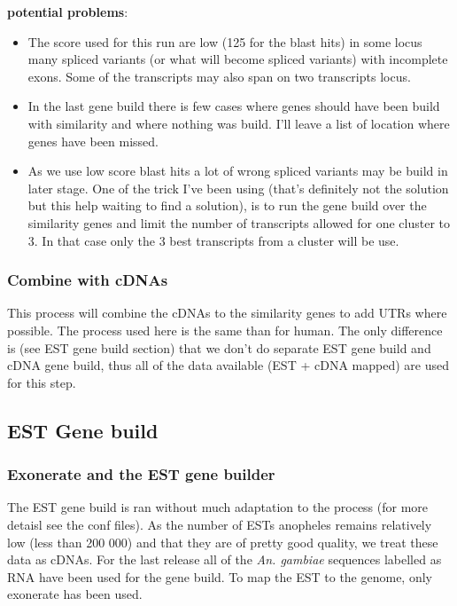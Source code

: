 \documentclass[a4paper,10pt]{article}
\begin{document}
\textbf{potential problems}: 
\begin{itemize}
\item The score used for this run are low (125 for the blast hits) in some locus many spliced variants (or what will become spliced variants) with incomplete exons. Some of the transcripts may also span on two transcripts locus.
\item In the last gene build there is few cases where genes should have been build with similarity and where nothing was build. I'll leave a list of location where genes have been missed.
\item As we use low score blast hits a lot of wrong spliced variants may be build in later stage. One of the trick I've been using (that's definitely not the solution but this help waiting to find a solution), is to run the gene build over the similarity genes and limit the number of transcripts allowed for one cluster to 3. In that case only the 3 best transcripts from a cluster will be use.

\end{itemize}

\subsubsection{Combine with cDNAs}
This process will combine the cDNAs to the similarity genes to add UTRs where possible. The process used here is the same than for human. The only difference is (see EST gene build section) that we don't do separate EST gene build and cDNA gene build, thus all of the data available (EST + cDNA mapped) are used for this step.

\subsection{EST Gene build}
\subsubsection{Exonerate and the EST gene builder}

The EST gene build is ran without much adaptation to the process (for more detaisl see the conf files). As the number of ESTs anopheles remains relatively low (less than 200 000) and that they are of pretty good quality, we treat these data as cDNAs. For the last release all of the \textit{An. gambiae} sequences labelled as RNA have been used for the gene build. 
To map the EST to the genome, only exonerate has been used.
\end{document}
